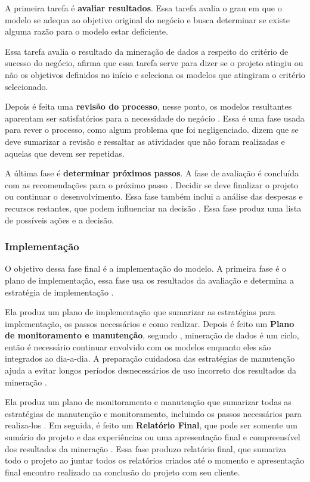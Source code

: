 A primeira tarefa é \textbf{avaliar resultados}. Essa tarefa avalia o grau em que o modelo se adequa ao objetivo original do negócio e busca determinar se existe alguma razão para o modelo estar deficiente.

Essa tarefa avalia o resultado da mineração de dados a respeito do critério de sucesso do negócio,  afirma que essa tarefa serve para dizer se o projeto atingiu ou não os objetivos definidos no início e seleciona os modelos que atingiram o critério selecionado.

Depois é feita uma \textbf{revisão do processo}, nesse ponto, os modelos resultantes aparentam ser satisfatórios para a necessidade do negócio \citep{crispmanual}. Essa é uma fase usada para rever o processo, como algum problema que foi negligenciado.  dizem que se deve sumarizar a revisão e ressaltar as atividades que não foram realizadas e aquelas que devem ser repetidas.

A última fase é \textbf{determinar próximos passos}. A fase de avaliação é concluída com as recomendações para o próximo passo \citep{dmfd}. Decidir se deve finalizar o projeto ou continuar o desenvolvimento. Essa fase também inclui a análise das despesas  e recursos restantes, que podem influenciar na decisão \citep{crispmanual}.
Essa fase produz uma lista de possíveis ações e a decisão.

\subsubsection{Implementação}
O objetivo dessa fase final é a implementação do modelo.
A primeira fase é o plano de implementação, essa fase usa os resultados da avaliação e determina a estratégia de implementação \citep{crispmanual}. 

Ela produz um plano de implementação que sumarizar as estratégias para implementação, os passos necessários e como realizar.
Depois é feito um \textbf{Plano de monitoramento e manutenção}, segundo , mineração de dados é um ciclo, então é necessário continuar envolvido com os modelos enquanto eles são integrados ao dia-a-dia. A preparação cuidadosa das estratégias de manutenção ajuda a evitar longos períodos desnecessários de uso incorreto dos resultados da mineração \citep{crispmanual}.

Ela produz um plano de monitoramento e manutenção que sumarizar todas as estratégias de manutenção e monitoramento, incluindo os passos necessários para realiza-los \citep{crispmanual}.
Em seguida, é feito um \textbf{Relatório Final}, que pode ser somente um sumário do projeto e das experiências ou uma apresentação final e compreensível dos resultados da mineração \citep{crispmanual}.
Essa fase produzo relatório final, que sumariza todo o projeto ao juntar todos os relatórios criados até o momento \citep{dmfd} e apresentação final encontro realizado na conclusão do projeto com seu cliente.

